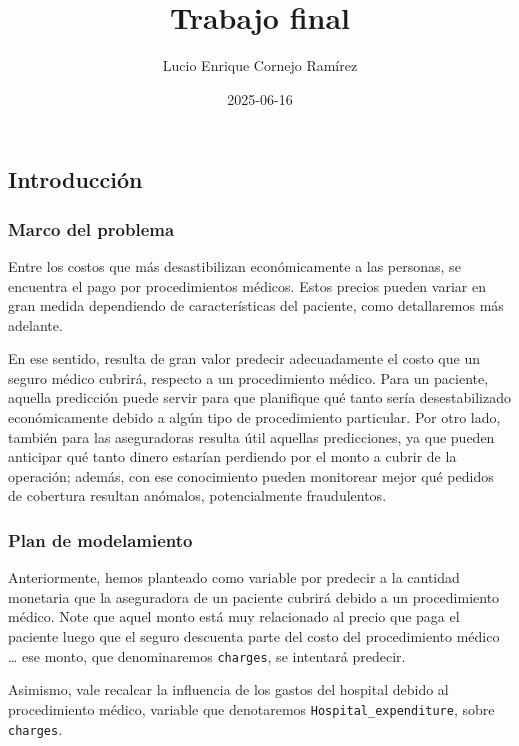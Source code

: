 \documentclass[
]{article}
\title{Trabajo final}
\author{Lucio Enrique Cornejo Ramírez}
\date{2025-06-16}
\begin{document}
\maketitle

{
\setcounter{tocdepth}{3}
\tableofcontents
}
\subsection{Introducción}\label{introducciuxf3n}

\subsubsection{Marco del problema}\label{marco-del-problema}

Entre los costos que más desastibilizan económicamente a las personas,
se encuentra el pago por procedimientos médicos. Estos precios pueden
variar en gran medida dependiendo de características del paciente, como
detallaremos más adelante.

En ese sentido, resulta de gran valor predecir adecuadamente el costo
que un seguro médico cubrirá, respecto a un procedimiento médico. Para
un paciente, aquella predicción puede servir para que planifique qué
tanto sería desestabilizado económicamente debido a algún tipo de
procedimiento particular. Por otro lado, también para las aseguradoras
resulta útil aquellas predicciones, ya que pueden anticipar qué tanto
dinero estarían perdiendo por el monto a cubrir de la operación; además,
con ese conocimiento pueden monitorear mejor qué pedidos de cobertura
resultan anómalos, potencialmente fraudulentos.

\subsubsection{Plan de modelamiento}\label{plan-de-modelamiento}

Anteriormente, hemos planteado como variable por predecir a la cantidad
monetaria que la aseguradora de un paciente cubrirá debido a un
procedimiento médico. Note que aquel monto está muy relacionado al
precio que paga el paciente luego que el seguro descuenta parte del
costo del procedimiento médico \ldots{} ese monto, que denominaremos
\texttt{charges}, se intentará predecir.

Asimismo, vale recalcar la influencia de los gastos del hospital debido
al procedimiento médico, variable que denotaremos
\texttt{Hospital\_expenditure}, sobre \texttt{charges}.
\end{document}
